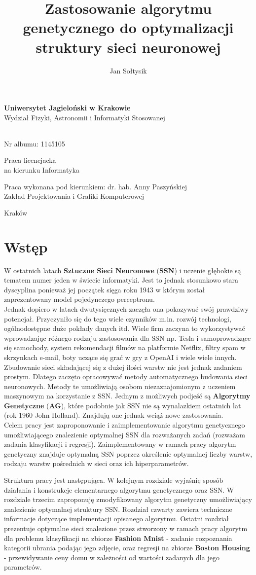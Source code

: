 \documentclass{article}
\title{Zastosowanie algorytmu genetycznego do optymalizacji struktury sieci neuronowej}
\author{Jan Sołtysik}
\makeatletter
\renewcommand{\maketitle}{\begin{titlepage}


    \begin{center}
	\LARGE \textbf{Uniwersytet Jagieloński w Krakowie}\\
	\large Wydział Fizyki, Astronomii i Informatyki Stosowanej
    \end{center}

    \begin{center}\small

    \vspace{2cm}

    \large \textbf{\textsc{\@author}} \\
    \normalsize Nr albumu: 1145105 \par

    \end{center}

    \vspace{3cm}


    \begin{center}
      \LARGE \textbf{\@title}
    \end{center}


     \begin{center}
	Praca licencjacka\\
	na kierunku Informatyka
     \end{center}

    \vspace{0.5cm}

    \begin{flushright}


    \vspace{6cm}

     {\small Praca wykonana pod kierunkiem:} dr. hab. Anny Paszyńskiej\\
     Zakład Projektowania i Grafiki Komputerowej\\

     \end{flushright}

    \vspace*{\stretch{6}}

    \begin{center}

    Kraków \@date

    \end{center}

  \end{titlepage}%

}
\makeatother
\begin{document}
\maketitle
\newpage
\tableofcontents
\newpage

\section{Wstęp}
W ostatnich latach \textbf{Sztuczne Sieci Neuronowe} (\textbf{SSN})  i uczenie głębokie  są tematem numer jeden w świecie
informatyki. Jest to jednak stosunkowo stara dyscyplina ponieważ jej początek sięga roku 1943 
w którym został zaprezentowany model pojedynczego perceptronu.\\
Jednak dopiero w latach dwutysięcznych zaczęła ona pokazywać swój prawdziwy potencjał.
Przyczyniło się do tego wiele czynników m.in. rozwój technologi, ogólnodostępne duże pokłady
danych itd. Wiele firm  zaczyna to wykorzystywać wprowadzając różnego 
rodzaju zastosowania dla SSN np. Tesla i samoprowadzące się samochody, system rekomendacji 
filmów na platformie Netflix, filtry spam w skrzynkach e-mail, boty uczące się grać w gry
z OpenAI  i wiele wiele innych.\\
Zbudowanie sieci składającej się z dużej ilości warstw nie jest jednak zadaniem prostym. 
Dlatego zaczęto opracowywać metody automatycznego budowania sieci neuronowych. 
Metody te umożliwiają osobom niezaznajomionym z uczeniem maszynowym na korzystanie z SSN. Jednym
z możliwych podjeść są \textbf{Algorytmy Genetyczne} (\textbf{AG}), które podobnie jak SSN nie są wynalazkiem
ostatnich lat (rok 1960 John Holland). Znajdują one jednak wciąż nowe zastosowania.\\
\indent Celem pracy jest zaproponowanie i zaimplementowanie algorytmu genetycznego umożliwiającego znalezienie 
optymalnej SSN dla rozważanych zadań (rozważam zadania klasyfikacji i regresji). 
Zaimplementowany w ramach pracy algorytm genetyczny znajduje optymalną SSN poprzez określenie optymalnej liczby warstw, rodzaju warstw pośrednich w sieci oraz ich hiperparametrów.

\indent Struktura pracy jest następująca. W kolejnym rozdziale wyjaśnię sposób działania 
i konstrukcje elementarnego algorytmu genetycznego oraz SSN.
W rozdziale trzecim zaproponuję zmodyfikowany algorytm genetyczny
umożliwiający znalezienie optymalnej struktury SSN.  Rozdział czwarty zawiera techniczne informacje dotyczące implementacji opisanego algorytmu.
Ostatni rozdział prezentuje optymalne sieci znalezione przez stworzony w ramach pracy algorytm
dla problemu klasyfikacji na zbiorze \textbf{Fashion Mnist} - zadanie rozpoznania kategorii
ubrania podając jego zdjęcie,
oraz  regresji na zbiorze \textbf{Boston Housing} - przewidywanie ceny domu w zależności od
wartości zadanych dla jego parametrów.
\newpage
\end{document}
